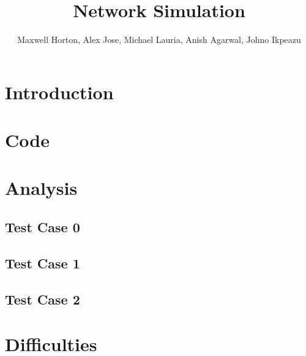 \documentclass[12pt]{article}
\begin{document}
\title{Network Simulation}
\author{Maxwell Horton, Alex Jose, Michael Lauria, Anish Agarwal, Johno Ikpeazu}

\maketitle
\noindent
\tableofcontents
\newpage
\section{Introduction}
\section{Code}
\section{Analysis}
\subsection{Test Case 0}
\subsection{Test Case 1}
\subsection{Test Case 2}
\section{Difficulties}
\end{document}
